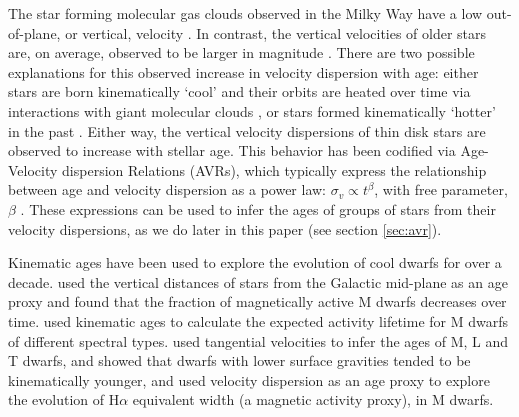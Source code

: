 The star forming molecular gas clouds observed in the Milky Way have a low
out-of-plane, or vertical, velocity \citep[\eg][]{stark1989, stark2005,
aumer2009, martig2014, aumer2016}.
In contrast, the vertical velocities of older stars are, on average, observed
to be larger in magnitude \citep{stromberg1946, wielen1977, nordstrom2004,
holmberg2007, holmberg2009, aumer2009, casagrande2011, ting2019, yu2018}.
There are two possible explanations for this observed increase in velocity
dispersion with age: either stars are born kinematically `cool' and their
orbits are heated over time via interactions with giant molecular clouds
\citep[see][for a review of secular evolution in the MW]{sellwood2014}, or
stars formed kinematically `hotter' in the past \citep[\eg][]{bird2013}.
Either way, the vertical velocity dispersions of thin disk stars are observed
to increase with stellar age.
This behavior has been codified via Age-Velocity dispersion Relations (AVRs),
which typically express the relationship between age and velocity dispersion
as a power law: $\sigma_v \propto t^\beta$, with free parameter, $\beta$
\citep[\eg][]{holmberg2009, yu2018}.
These expressions can be used to infer the ages of groups of stars from their
velocity dispersions, as we do later in this paper (see section
\ref{sec:avr}).

Kinematic ages have been used to explore the evolution of cool dwarfs for over
a decade.
\citet{west2004, west2006} used the vertical distances of stars from the
Galactic mid-plane as an age proxy and found that the fraction of magnetically
active M dwarfs decreases over time.
\citet{west2008} used kinematic ages to calculate the expected activity
lifetime for M dwarfs of different spectral types.
\citet{faherty2009} used tangential velocities to infer the ages of M, L and T
dwarfs, and showed that dwarfs with lower surface gravities tended to be
kinematically younger, and \citet{kiman2019} used velocity dispersion as an
age proxy to explore the evolution of H$\alpha$ equivalent width (a magnetic
activity proxy), in M dwarfs.

